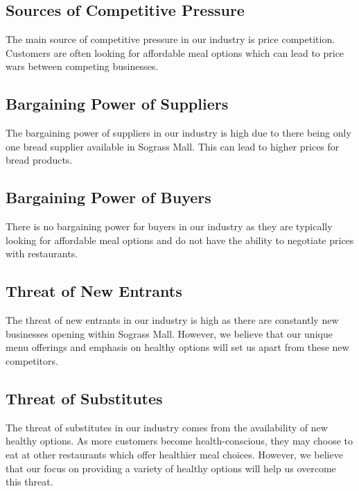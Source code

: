 \subsection{Sources of Competitive Pressure}
The main source of competitive pressure in our industry is price competition. Customers are often looking for affordable meal options which can lead to price wars between competing businesses.

\subsection{Bargaining Power of Suppliers}
The bargaining power of suppliers in our industry is high due to there being only one bread supplier available in Sograss Mall. This can lead to higher prices for bread products.

\subsection{Bargaining Power of Buyers}
There is no bargaining power for buyers in our industry as they are typically looking for affordable meal options and do not have the ability to negotiate prices with restaurants.

\subsection{Threat of New Entrants}
The threat of new entrants in our industry is high as there are constantly new businesses opening within Sograss Mall. However, we believe that our unique menu offerings and emphasis on healthy options will set us apart from these new competitors.

\subsection{Threat of Substitutes}
The threat of substitutes in our industry comes from the availability of new healthy options. As more customers become health-conscious, they may choose to eat at other restaurants which offer healthier meal choices. However, we believe that our focus on providing a variety of healthy options will help us overcome this threat.
